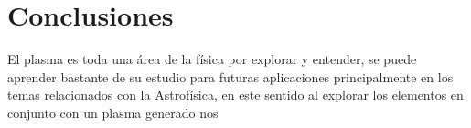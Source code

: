 \documentclass[12pt]{IEEEtran}
\begin{document}
\section{Conclusiones}
El plasma es toda una área de la física por explorar y entender, se puede aprender bastante de su estudio para futuras aplicaciones principalmente en los temas relacionados con la Astrofísica, en este sentido al explorar los elementos en conjunto con un plasma generado nos 



\nocite{*}
\printbibliography
\end{document}

